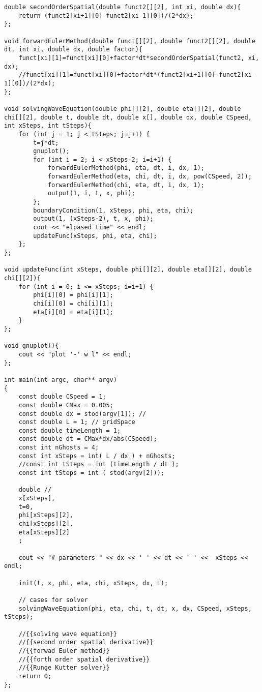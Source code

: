 \documentclass[10pt,fleqn,reqno,a4paper]{article}
\begin{document}
\begin{verbatim}
double secondOrderSpatial(double funct2[][2], int xi, double dx){
    return (funct2[xi+1][0]-funct2[xi-1][0])/(2*dx);
};

void forwardEulerMethod(double funct[][2], double funct2[][2], double dt, int xi, double dx, double factor){
    funct[xi][1]=funct[xi][0]+factor*dt*secondOrderSpatial(funct2, xi, dx);
    //funct[xi][1]=funct[xi][0]+factor*dt*(funct2[xi+1][0]-funct2[xi-1][0])/(2*dx);
};

void solvingWaveEquation(double phi[][2], double eta[][2], double chi[][2], double t, double dt, double x[], double dx, double CSpeed, int xSteps, int tSteps){
    for (int j = 1; j < tSteps; j=j+1) {
        t=j*dt;
        gnuplot();
        for (int i = 2; i < xSteps-2; i=i+1) {
            forwardEulerMethod(phi, eta, dt, i, dx, 1);
            forwardEulerMethod(eta, chi, dt, i, dx, pow(CSpeed, 2));
            forwardEulerMethod(chi, eta, dt, i, dx, 1);
            output(1, i, t, x, phi);
        };
        boundaryCondition(1, xSteps, phi, eta, chi);
        output(1, (xSteps-2), t, x, phi);
        cout << "elpased time" << endl;
        updateFunc(xSteps, phi, eta, chi);
    };
};

void updateFunc(int xSteps, double phi[][2], double eta[][2], double chi[][2]){
    for (int i = 0; i <= xSteps; i=i+1) {
        phi[i][0] = phi[i][1];
        chi[i][0] = chi[i][1];
        eta[i][0] = eta[i][1];
	}
};

void gnuplot(){
    cout << "plot '-' w l" << endl;
};

int main(int argc, char** argv)
{
    const double CSpeed = 1;
    const double CMax = 0.005;
    const double dx = stod(argv[1]); //
    const double L = 1; // gridSpace
    const double timeLength = 1;
    const double dt = CMax*dx/abs(CSpeed);
    const int nGhosts = 4;
    const int xSteps = int( L / dx ) + nGhosts;
    //const int tSteps = int (timeLength / dt );
    const int tSteps = int ( stod(argv[2]));

    double //
    x[xSteps],
    t=0,
    phi[xSteps][2],
    chi[xSteps][2],
    eta[xSteps][2]
    ;

    cout << "# parameters " << dx << ' ' << dt << ' ' <<  xSteps << endl;

    init(t, x, phi, eta, chi, xSteps, dx, L);

    // cases for solver
    solvingWaveEquation(phi, eta, chi, t, dt, x, dx, CSpeed, xSteps, tSteps);

    //{{solving wave equation}}
    //{{second order spatial derivative}}
    //{{forwad Euler method}}
    //{{forth order spatial derivative}}
    //{{Runge Kutter solver}}
	return 0;
};
\end{verbatim}
\end{document}
